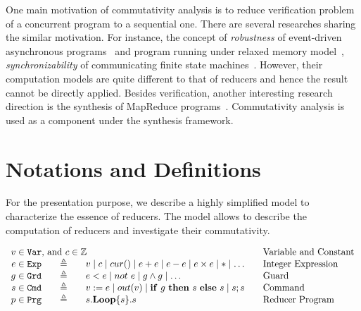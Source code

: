 \documentclass{llncs}
\newcommand{\Var}{\mathtt{Var}}
\newcommand{\Exp}{\mathtt{Exp}}
\newcommand{\Cmd}{\mathtt{Cmd}}
\newcommand{\Grd}{\mathtt{Grd}}
\newcommand{\Prg}{\mathtt{Prg}}
\newcommand{\cur}{cur()}
\newcommand{\ite}[3]{
	 \ifmmode 
	 \mathbf{if}\ #1 \ \mathbf{then}\ #2\  \mathbf{else}\ #3 
	 \else
	 \textbf{if}\ #1 \ \textbf{then}\ #2\  \textbf{else}\ #3
	 \fi}
\newcommand{\rloop}{
	\ifmmode 
	\mathbf{Loop}
	\else
	\textbf{Loop}
	\fi}
\newcommand{\Z}{\mathbb{Z}}
\begin{document}
One main motivation of commutativity analysis is to reduce verification problem of a concurrent program to a sequential one. There are several researches sharing the similar motivation. For instance, the concept of \emph{robustness} of event-driven asynchronous programs~\cite{ahmed2017:robustness}  and program running under relaxed memory model~\cite{ahmed2013:robustness,AbdullaACLR13,AbdullaACLR12}, \emph{synchronizability} of communicating finite state machines~\cite{FinkelL17,basu2012synchronizability,basu2011choreography}. However, their computation models are quite different to that of reducers and hence the result cannot be directly applied. Besides verification, another interesting research direction is the synthesis of MapReduce programs~\cite{SmithA16}. Commutativity analysis is used as a component under the synthesis framework.

\section{Notations and Definitions}
\label{section:integer-reducers}
For the presentation purpose, we describe a highly simplified model to characterize the essence of reducers. The model allows to describe the computation of reducers and investigate their commutativity.

\begin{equation*}
\begin{array}{rclcl}
\multicolumn{3}{l}{v\in \Var\mbox{, and }c \in \Z}&&\textmd{Variable and Constant}\\
e \in \Exp    &\ \ \  {\triangleq}\ \ \   & v \mid c \mid \cur \mid e + e \mid e - e \mid e \times e \mid *\mid\ldots & &\textmd{Integer Expression}\\
g\in \Grd  & {\triangleq}  & e < e \mid not\ e \mid g \wedge g  \mid \ldots& & \textmd{Guard}\\
s\in \Cmd  & {\triangleq}  & v:= e \mid out(v) \mid \ite{g}{s}{s} \mid s;s && \textmd{Command}\\
p\in \Prg  & {\triangleq}  & s.\rloop\{s\}.s&& \textmd{Reducer Program}\\
\end{array}
\end{equation*}
\end{document}
